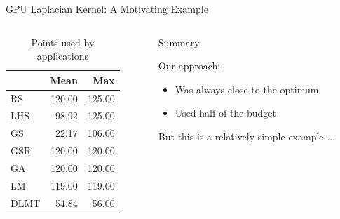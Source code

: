 \documentclass[10pt, compress, aspectratio=169, xcolor={table,usenames,dvipsnames}]{beamer}
\begin{document}
\begin{frame}[label={sec:org5a0cd1d}]{GPU Laplacian Kernel: A Motivating Example}
\begin{columns}
\begin{column}{0.5\columnwidth}
\begin{table}[ht]
\centering
\begingroup\small
\begin{tabular}{lrr}
  \hline
  & Mean & Max \\
  \hline
  RS & 120.00 & 125.00 \\
  LHS & 98.92 & 125.00 \\
  GS & 22.17 & 106.00 \\
  GSR & 120.00 & 120.00 \\
  GA & 120.00 & 120.00 \\
  LM & 119.00 & 119.00 \\
  DLMT & 54.84 & 56.00 \\
    \hline
\end{tabular}
\endgroup
\caption{Points used by applications}
\end{table}
\end{column}

\begin{column}{0.5\columnwidth}
\begin{block}{Summary}
\vspace{.2cm}

Our approach:

\begin{itemize}
\item Was \alert{always close to the optimum}
\item Used \alert{half of the budget}
\end{itemize}

But this is a \alert{relatively simple example} \(\dots\)
\end{block}
\end{column}
\end{columns}
\end{frame}
\end{document}
